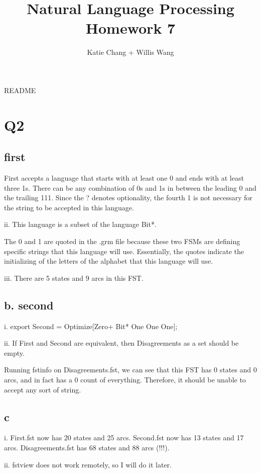 \documentclass[12pt, letterpaper]{article}
\title{Natural Language Processing Homework 7}
\author{Katie Chang + Willis Wang}
\begin{document}
\maketitle

README

\section{Q2}

\subsection{first}

First accepts a language that starts with at least one 0 and ends with at least three 1s. There can be any combination of 0s and 1s in between the leading 0 and the trailing 111. Since the ? denotes optionality, the fourth 1 is not necessary for the string to be accepted in this language. 

ii. This language is a subset of the language Bit*.

The 0 and 1 are quoted in the .grm file because these two FSMs are defining specific strings that this language will use. Essentially, the quotes indicate the initializing of the  letters of the alphabet that this language will use.

iii. There are 5 states and 9 arcs in this FST.

\subsection{b. second}

i. export Second = Optimize[Zero+ Bit* One One One];

ii. If First and Second are equivalent, then Disagreements as a set should be empty. 

Running fstinfo on Disagreements.fst, we can see that this FST has 0 states and 0 arcs, and in fact has a 0 count of everything. Therefore, it should be unable to accept any sort of string.

\subsection{c}

i. First.fst now has 20 states and 25 arcs. Second.fst now has 13 states and 17 arcs. Disagreements.fst has 68 states and 88 arcs (!!!). 

ii. fstview does not work remotely, so I will do it later.
\end{document}

